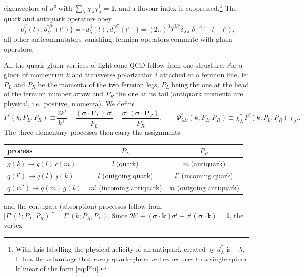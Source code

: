 \documentclass[11pt,a4paper]{article}
\numberwithin{equation}{section}
\newcommand{\dg}{\dagger}
\newcommand{\dthree}{\delta^{(3)}}
\newcommand{\Gam}{\Gamma}
\newcommand{\Ph}{\Phi}
\begin{document}
eigenvectors of $\sigma^{3}$ with $\sum_{\lambda}\chi_{\lambda}\chi^{\dg}_{\lambda}=\mathbf 1$, and a
flavour index is suppressed.\footnote{With this labelling the physical helicity of an antiquark
created by $d^{\dg}_{\lambda}$ is $-\lambda$. It has the advantage that every quark--gluon vertex
reduces to a single spinor bilinear of the form \eqref{eq:Phi}.} The quark and antiquark
operators obey
\begin{equation}
\big\{b^{\beta}_{\lambda}(l),b^{\dg\beta'}_{\lambda'}(l')\big\}
=\big\{d^{\beta}_{\lambda}(l),d^{\dg\beta'}_{\lambda'}(l')\big\}
=(2\pi)^{3}\delta^{\beta\beta'}\delta_{\lambda\lambda'}\,\dthree(l-l'),
\label{eq:bb}
\end{equation}
all other anticommutators vanishing; fermion operators commute with gluon operators.

All the quark--gluon vertices of light-cone QCD follow from one structure. For a gluon of
momentum $k$ and transverse polarization $i$ attached to a fermion line, let $P_{L}$ and $P_{R}$
be the momenta of the two fermion legs, $P_{L}$ being the one at the head of the fermion number
arrow and $P_{R}$ the one at its tail (antiquark momenta are physical, i.e.\ positive, momenta).
We define
\begin{equation}
\Gam^{i}(k;P_{L},P_{R})\equiv\frac{2k^{i}}{k^{+}}
-\frac{(\bm\sigma\!\cdot\!\bm P_{L})\,\sigma^{i}}{P_{L}^{+}}
-\frac{\sigma^{i}\,(\bm\sigma\!\cdot\!\bm P_{R})}{P_{R}^{+}},
\qquad
\Ph^{i}_{\lambda\lambda'}(k;P_{L},P_{R})\equiv\chi^{\dg}_{\lambda}\,\Gam^{i}(k;P_{L},P_{R})\,\chi_{\lambda'} .
\label{eq:Phi}
\end{equation}
The three elementary processes then carry the assignments
\begin{center}
\begin{tabular}{lcc}
\toprule
process & $P_{L}$ & $P_{R}$\\\midrule
$g(k)\to q(l)\,\bar q(m)$ & $l$ (quark) & $m$ (antiquark)\\
$q(l')\to q(l)\,g(k)$ & $l$ (outgoing quark) & $l'$ (incoming quark)\\
$\bar q(m')\to\bar q(m)\,g(k)$ & $m'$ (incoming antiquark) & $m$ (outgoing antiquark)\\
\bottomrule
\end{tabular}
\end{center}
and the conjugate (absorption) processes follow from $\big[\Gam^{i}(k;P_{L},P_{R})\big]^{\dg}
=\Gam^{i}(k;P_{R},P_{L})$. Since
$2k^{i}-(\bm\sigma\!\cdot\!\bm k)\sigma^{i}-\sigma^{i}(\bm\sigma\!\cdot\!\bm k)=0$, the vertex
\end{document}
